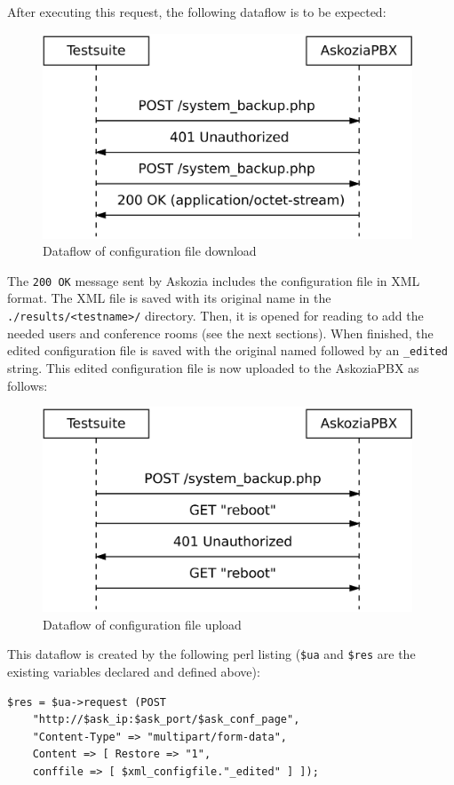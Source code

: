 After executing this request, the following dataflow is to be expected:
\begin{figure} [h!]
\centering
\includegraphics [width=11cm] {configuration-2}
\caption {Dataflow of configuration file download}
\end{figure}

The \texttt{200 OK} message sent by Askozia includes the configuration file in XML format. The XML file is saved with its original name
in the \texttt{./results/<testname>/} directory. Then, it is opened for reading to add the needed users and conference rooms
(see the next sections). When finished, the edited configuration file is saved with the original named followed by an \texttt{\_edited}
string. This edited configuration file is now uploaded to the AskoziaPBX as follows: \newpage

\begin{figure} [htbp]
\centering
\includegraphics [width=11cm] {configuration-3}
\caption {Dataflow of configuration file upload}
\end{figure}

This dataflow is created by the following perl listing (\texttt{\$ua} and \texttt{\$res} are the existing variables declared and defined above):

\begin{lstlisting}[breaklines=true,label=code:config-post-request-upload,caption={POST request for uploading configuration file} ]
$res = $ua->request (POST
    "http://$ask_ip:$ask_port/$ask_conf_page",
	"Content-Type" => "multipart/form-data",
    Content => [ Restore => "1",
    conffile => [ $xml_configfile."_edited" ] ]);
\end{lstlisting}


